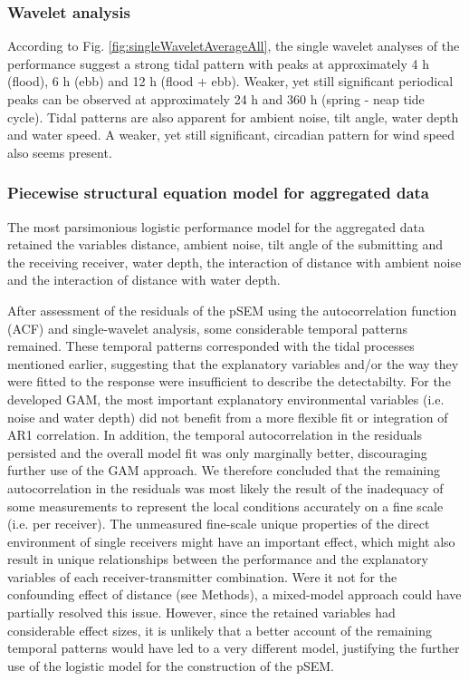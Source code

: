 \documentclass[doublespacing,linenumbers]{bmcart}
\begin{document}
\subsubsection*{Wavelet analysis}

According to Fig. \ref{fig:singleWaveletAverageAll}, the single wavelet analyses of the performance suggest a strong tidal pattern with peaks at approximately 4 h (flood), 6 h (ebb) and 12 h (flood + ebb). Weaker, yet still significant periodical peaks can be observed at approximately 24 h and 360 h (spring - neap tide cycle). Tidal patterns are also apparent for ambient noise, tilt angle, water depth and water speed. A weaker, yet still significant, circadian pattern for wind speed also seems present. 

\subsubsection*{Piecewise structural equation model for aggregated data}

The most parsimonious logistic performance model for the aggregated data retained the variables distance, ambient noise, tilt angle of the submitting and the receiving receiver, water depth, the interaction of distance with ambient noise and the interaction of distance with water depth.

After assessment of the residuals of the pSEM using the autocorrelation function (ACF) and single-wavelet analysis, some considerable temporal patterns remained. These temporal patterns corresponded with the tidal processes mentioned earlier, suggesting that the explanatory variables and/or the way they were fitted to the response were insufficient to describe the detectabilty. For the developed GAM, the most important explanatory environmental variables (i.e. noise and water depth) did not benefit from a more flexible fit or integration of AR1 correlation. In addition, the temporal autocorrelation in the residuals persisted and the overall model fit was only marginally better, discouraging further use of the GAM approach. We therefore concluded that the remaining autocorrelation in the residuals was most likely the result of the inadequacy of some measurements to represent the local conditions accurately on a fine scale (i.e. per receiver). The unmeasured fine-scale unique properties of the direct environment of single receivers might have an important effect, which might also result in unique relationships between the performance and the explanatory variables of each receiver-transmitter combination. Were it not for the confounding effect of distance (see Methods), a mixed-model approach could have partially resolved this issue. However, since the retained variables had considerable effect sizes, it is unlikely that a better account of the remaining temporal patterns would have led to a very different model, justifying the further use of the logistic model for the construction of the pSEM. 
\end{document}
